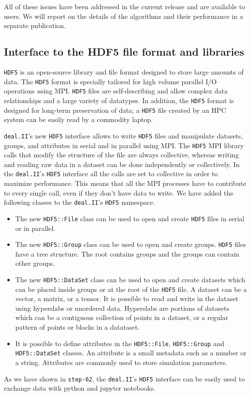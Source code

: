 \documentclass{ansarticle-preprint}
\newcommand{\specialword}[1]{\texttt{#1}}
\newcommand{\dealii}{{\specialword{deal.II}}\xspace}
\begin{document}
All of these issues have been addressed in the current release and are
available to users. We will report on the details of the algorithms
and their performance in a separate publication.


\subsection{Interface to the HDF5 file format and libraries}
\label{subsec:hdf5}
\texttt{HDF5} is an open-source library and file format designed to store large amounts of data.
The \texttt{HDF5} format is specially tailored for high volume parallel I/O operations using MPI.
\texttt{HDF5} files are self-describing and allow complex data relationships and a large variety
of datatypes. In addition, the \texttt{HDF5} format is designed for long-term preservation of
data; a \texttt{HDF5} file created by an HPC system can be easily read by a commodity laptop.

\dealii{}'s new  \texttt{HDF5} interface allows to write \texttt{HDF5} files and manipulate
datasets, groups, and attributes in serial and in parallel using MPI. The
\texttt{HDF5} MPI library calls that modify the structure of the file are
always collective, whereas writing and reading raw data in a dataset can be done
independently or collectively. In the \dealii{}'s \texttt{HDF5} interface all the calls are
set to collective in order to maximize performance. This means that all the MPI
processes have to contribute to every single call, even if they don't have data to write.
We have added the following classes to the \dealii{}'s \texttt{HDF5} namespace.
\begin{itemize}
\item The new \texttt{HDF5::File} class can be used to open and create \texttt{HDF5} files
in serial or in parallel.
\item The new \texttt{HDF5::Group} class can be used to open and create groups.
 \texttt{HDF5} files have a tree structure. The root contains groups and
the groups can contain other groups.
\item The new \texttt{HDF5::DataSet} class can be used to open and create datasets which
can be placed inside groups or at the root of the \texttt{HDF5} file. A dataset can be a
vector, a matrix, or a tensor. It is possible to read and write in the dataset using
hyperslabs or unordered data. Hyperslabs are portions of datasets
which can be a contiguous collection of points in a dataset, or a regular
pattern of points or blocks in a datataset.
\item It is possible to define attributes in the \texttt{HDF5::File}, \texttt{HDF5::Group} and
\texttt{HDF5::DataSet} classes. An attribute is a small metadata such as a number or a string.
Attributes are commonly used to store simulation parameters.
\end{itemize}
As we have shown in \texttt{step-62}, the \dealii{}'s \texttt{HDF5} interface can be easily used
to exchange data with python and jupyter notebooks.
\end{document}
